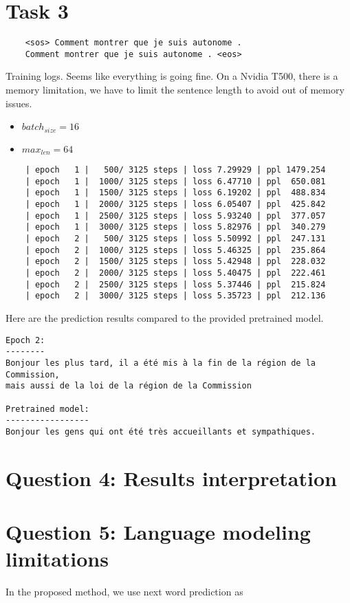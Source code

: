 \documentclass[a4paper]{article}
\begin{document}
\section*{Task 3}
\begin{verbatim}
    <sos> Comment montrer que je suis autonome .
    Comment montrer que je suis autonome . <eos>
\end{verbatim}

Training logs. Seems like everything is going fine.
On a Nvidia T500, there is a memory limitation, we have to limit the sentence length to avoid out of memory issues.


\begin{itemize}
    \item $batch_{size} = 16$
    \item $max_{len} = 64$
\end{itemize}

\begin{verbatim}
    | epoch   1 |   500/ 3125 steps | loss 7.29929 | ppl 1479.254
    | epoch   1 |  1000/ 3125 steps | loss 6.47710 | ppl  650.081
    | epoch   1 |  1500/ 3125 steps | loss 6.19202 | ppl  488.834
    | epoch   1 |  2000/ 3125 steps | loss 6.05407 | ppl  425.842
    | epoch   1 |  2500/ 3125 steps | loss 5.93240 | ppl  377.057
    | epoch   1 |  3000/ 3125 steps | loss 5.82976 | ppl  340.279
    | epoch   2 |   500/ 3125 steps | loss 5.50992 | ppl  247.131
    | epoch   2 |  1000/ 3125 steps | loss 5.46325 | ppl  235.864
    | epoch   2 |  1500/ 3125 steps | loss 5.42948 | ppl  228.032
    | epoch   2 |  2000/ 3125 steps | loss 5.40475 | ppl  222.461
    | epoch   2 |  2500/ 3125 steps | loss 5.37446 | ppl  215.824
    | epoch   2 |  3000/ 3125 steps | loss 5.35723 | ppl  212.136
\end{verbatim}



Here are the prediction results compared to the provided pretrained model.

\begin{verbatim}
Epoch 2:
--------
Bonjour les plus tard, il a été mis à la fin de la région de la Commission,
mais aussi de la loi de la région de la Commission

Pretrained model:
-----------------
Bonjour les gens qui ont été très accueillants et sympathiques.
\end{verbatim}


\section{Question 4: Results interpretation}



\section{Question 5: Language modeling limitations}
In the proposed method, we use next word prediction as 


\end{document}
